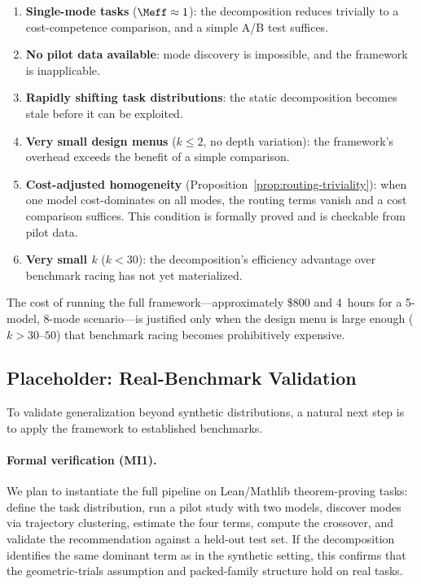 \begin{enumerate}
  \item \textbf{Single-mode tasks} ($\Meff \approx 1$): the decomposition reduces trivially to a cost-competence comparison, and a simple A/B test suffices.
  \item \textbf{No pilot data available}: mode discovery is impossible, and the framework is inapplicable.
  \item \textbf{Rapidly shifting task distributions}: the static decomposition becomes stale before it can be exploited.
  \item \textbf{Very small design menus} ($k \le 2$, no depth variation): the framework's overhead exceeds the benefit of a simple comparison.
  \item \textbf{Cost-adjusted homogeneity} (Proposition~\ref{prop:routing-triviality}): when one model cost-dominates on all modes, the routing terms vanish and a cost comparison suffices.
  This condition is formally proved and is checkable from pilot data.
  \item \textbf{Very small $k$} ($k < 30$): the decomposition's efficiency advantage over benchmark racing has not yet materialized.
\end{enumerate}

The cost of running the full framework---approximately \$800 and 4~hours for a 5-model, 8-mode scenario---is justified only when the design menu is large enough ($k > 30\text{--}50$) that benchmark racing becomes prohibitively expensive.

\subsection{Placeholder: Real-Benchmark Validation}
\label{sec:real-benchmarks}

To validate generalization beyond synthetic distributions, a natural next step is to apply the framework to established benchmarks.

\paragraph{Formal verification (MI1).}
We plan to instantiate the full pipeline on Lean/Mathlib theorem-proving tasks: define the task distribution, run a pilot study with two models, discover modes via trajectory clustering, estimate the four terms, compute the crossover, and validate the recommendation against a held-out test set.
If the decomposition identifies the same dominant term as in the synthetic setting, this confirms that the geometric-trials assumption and packed-family structure hold on real tasks.

